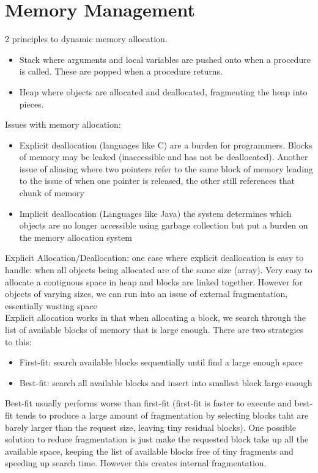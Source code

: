 \documentclass{article}
\begin{document}
  \section{Memory Management}
  2 principles to dynamic memory allocation. 
  \begin{itemize}[noitemsep]
  \item Stack where arguments and local variables are pushed onto when a procedure is called. These are popped when a procedure returns. 
  \item Heap where objects are allocated and deallocated, fragmenting the heap into pieces.
  \end{itemize}
  Issues with memory allocation:
  \begin{itemize}[noitemsep]
    \item Explicit deallocation (languages like C) are a burden for programmers. Blocks of memory may be leaked (inaccessible and has not be deallocated). Another issue of aliasing where two pointers refer to the same block of memory leading to the issue of when one pointer is released, the other still references that chunk of memory
    \item Implicit deallocation (Languages like Java) the system determines which objects are no longer accessible using garbage collection but put a burden on the memory allocation system
  \end{itemize}
  Explicit Allocation/Deallocation: one case where explicit deallocation is easy to handle: when all objects being allocated are of the same size (array). Very easy to allocate a contiguous space in heap and blocks are linked together. However for objects of varying sizes, we can run into an issue of external fragmentation, essentially wasting space\\ 
  Explicit allocation works in that when allocating a block, we search through the list of available blocks of memory that is large enough. There are two strategies to this:
  \begin{itemize}
    \item First-fit: search available blocks sequentially until find a large enough space
    \item Best-fit: search all available blocks and insert into smallest block large enough
  \end{itemize}
  Best-fit usually performs worse than first-fit (first-fit is faster to execute and best-fit tends to produce a large amount of fragmentation by selecting blocks taht are barely larger than the request size, leaving tiny residual blocks). One possible solution to reduce fragmentation is just make the requested block take up all the available space, keeping the list of available blocks free of tiny fragments and speeding up search time. However this creates internal fragmentation.\\
\end{document}
